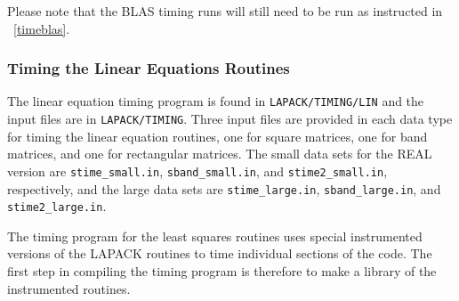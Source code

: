 \documentclass[11pt]{report}
\begin{document}
Please note that the BLAS
timing runs will still need to be run as instructed in ~\ref{timeblas}.

\subsubsection{Timing the Linear Equations Routines}\label{timelin}

The linear equation timing program is found in \texttt{LAPACK/TIMING/LIN}
and the input files are in \texttt{LAPACK/TIMING}.
Three input files are provided in each data type for timing the
linear equation routines, one for square matrices, one for band
matrices, and one for rectangular matrices.  The small data sets for the REAL version
are \texttt{stime\_small.in}, \texttt{sband\_small.in}, and \texttt{stime2\_small.in}, respectively,
and the large data sets are
\texttt{stime\_large.in}, \texttt{sband\_large.in}, and \texttt{stime2\_large.in}.

The timing program for the least squares routines uses special instrumented
versions of the LAPACK routines to time individual sections of the code.
The first step in compiling the timing program is therefore to make a library
of the instrumented routines.
\end{document}
